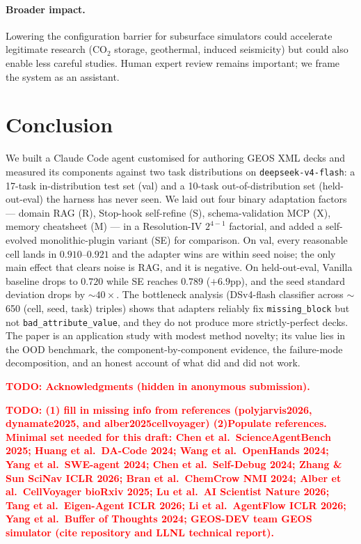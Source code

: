 \documentclass{article}
\newcommand{\todo}[1]{\textcolor{red}{\textbf{TODO: #1}}}
\begin{document}
\paragraph{Broader impact.}
Lowering the configuration barrier for subsurface simulators could accelerate legitimate research (CO$_2$ storage, geothermal, induced seismicity) but could also enable less careful studies. Human expert review remains important; we frame the system as an assistant.


\section{Conclusion}
\label{sec:conclusion}

We built a Claude Code agent customised for authoring GEOS XML decks and measured its components against two task distributions on \texttt{deepseek-v4-flash}: a 17-task in-distribution test set (val) and a 10-task out-of-distribution set (held-out-eval) the harness has never seen. We laid out four binary adaptation factors --- domain RAG (R), Stop-hook self-refine (S), schema-validation MCP (X), memory cheatsheet (M) --- in a Resolution-IV $2^{4-1}$ factorial, and added a self-evolved monolithic-plugin variant (SE) for comparison. On val, every reasonable cell lands in $0.910$--$0.921$ and the adapter wins are within seed noise; the only main effect that clears noise is RAG, and it is negative. On held-out-eval, Vanilla baseline drops to $0.720$ while SE reaches $0.789$ ($+6.9$pp), and the seed standard deviation drops by ${\sim}40\times$. The bottleneck analysis (DSv4-flash classifier across $\sim$650 (cell, seed, task) triples) shows that adapters reliably fix \texttt{missing\_block} but not \texttt{bad\_attribute\_value}, and they do not produce more strictly-perfect decks. The paper is an application study with modest method novelty; its value lies in the OOD benchmark, the component-by-component evidence, the failure-mode decomposition, and an honest account of what did and did not work.


\begin{ack}
\todo{Acknowledgments (hidden in anonymous submission).}
\end{ack}


\todo{(1) fill in missing info from references (polyjarvis2026, dynamate2025, and alber2025cellvoyager) (2)Populate references. Minimal set needed for this draft: Chen et al.\ ScienceAgentBench 2025; Huang et al.\ DA-Code 2024; Wang et al.\ OpenHands 2024; Yang et al.\ SWE-agent 2024; Chen et al.\ Self-Debug 2024; Zhang \& Sun SciNav ICLR 2026; Bran et al.\ ChemCrow NMI 2024; Alber et al.\ CellVoyager bioRxiv 2025; Lu et al.\ AI Scientist Nature 2026; Tang et al.\ Eigen-Agent ICLR 2026; Li et al.\ AgentFlow ICLR 2026; Yang et al.\ Buffer of Thoughts 2024; GEOS-DEV team GEOS simulator (cite repository and LLNL technical report).}
\end{document}
